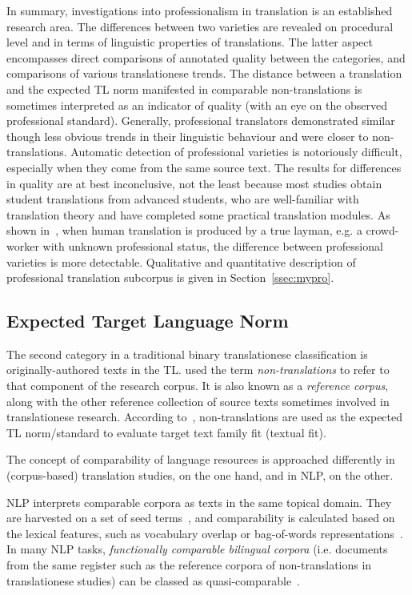 In summary, investigations into professionalism in translation is an established research area. The differences between two varieties are revealed on procedural level and in terms of linguistic properties of translations. The latter aspect encompasses direct comparisons of annotated quality between the categories, and comparisons of various translationese trends. The distance between a translation and the expected TL norm manifested in comparable non-translations is sometimes interpreted as an indicator of quality (with an eye on the observed professional standard). Generally, professional translators demonstrated similar though less obvious trends in their linguistic behaviour and were closer to non-translations. Automatic detection of professional varieties is notoriously difficult, especially when they come from the same source text. The results for differences in quality are at best inconclusive, not the least because most studies obtain student translations from advanced students, who are well-familiar with translation theory and have completed some practical translation modules. As shown in~\citet{Popovic2020}, when human translation is produced by a true layman, e.g. a crowd-worker with unknown professional status, the difference between professional varieties is more detectable. Qualitative and quantitative description of professional translation subcorpus is given in Section~\ref{ssec:mypro}.

\subsection{\label{ssec:norm}Expected Target Language Norm}
The second category in a traditional binary translationese classification is originally-authored texts in the TL. \citet{Chesterman2004} used the term \textit{non-translations} to refer to that component of the research corpus. It is also known as a \textit{reference corpus}, along with the other reference collection of source texts sometimes involved in translationese research. According to~\citet{Chesterman2004}, non-translations are used as the expected TL norm/standard to evaluate target text family fit (textual fit).

The concept of comparability of language resources is approached differently in (corpus-based) translation studies, on the one hand, and in \gls{NLP}, on the other. 

NLP interprets comparable corpora as texts in the same topical domain. They are harvested on a set of seed terms~\cite{Kilgarriff2011}, and comparability is calculated based on the lexical features, such as vocabulary overlap or bag-of-words representations~\cite{Li2018}. In many NLP tasks, \textit{functionally comparable bilingual corpora} (i.e. documents from the same register such as the reference corpora of non-translations in translationese studies) can be classed as quasi-comparable~\cite[see, for example, their definition as ``non-aligned, and non-translated bilingual documents that could either be on the same topic (in-topic) or not (off-topic)'' in ][p.1051]{Fung2004}. 

